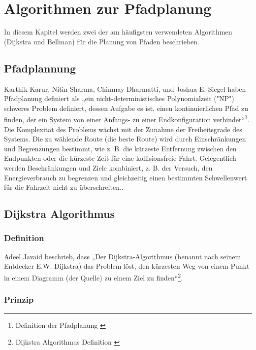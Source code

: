 \chapter{Algorithmen zur Pfadplanung}
In diesem Kapitel werden zwei der am häufigsten verwendeten Algorithmen (Dijkstra und Bellman) für die Planung von Pfaden beschrieben.

\section{Pfadplannung}

Karthik Karur, Nitin Sharma, Chinmay Dharmatti, und Joshua E. Siegel haben Pfadplanung definiert als „ein nicht-deterministisches Polynomialzeit ("NP") schweres Problem definiert, dessen Aufgabe es ist, einen kontinuierlichen Pfad zu finden, der ein System von einer Anfangs- zu einer Endkonfiguration verbindet“\footnote{Definition der Pfadplanung \cite{vehicles3030027}}.
\newline
\newline
Die Komplexität des Problems wächst mit der Zunahme der Freiheitsgrade des Systems. Die zu wählende Route (die beste Route) wird durch Einschränkungen und Begrenzungen bestimmt, wie z. B. die kürzeste Entfernung zwischen den Endpunkten oder die kürzeste Zeit für eine kollisionsfreie Fahrt. Gelegentlich werden Beschränkungen und Ziele kombiniert, z. B. der Versuch, den Energieverbrauch zu begrenzen und gleichzeitig einen bestimmten Schwellenwert für die Fahrzeit nicht zu überschreiten.\cite{vehicles3030027}.



\section{Dijkstra Algorithmus}

\subsection{Definition}

Adeel Javaid beschrieb, dass „Der Dijkstra-Algorithmus (benannt nach seinem Entdecker E.W. Dijkstra) das Problem löst, den kürzesten Weg von einem Punkt in einem Diagramm (der Quelle) zu einem Ziel zu finden“\footnote{Dijkstra Algorithmus Definition \cite{SSRN-id2340905}}.

\subsection{Prinzip}


